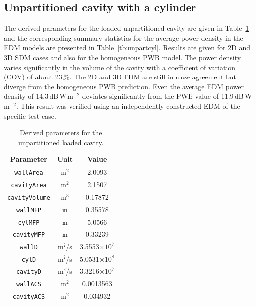 \documentclass[a4paper]{article}
\numberwithin{equation}{section}
\newcounter{Table}
\begin{document}
\subsection[Unpartitioned cavity with a cylinder]{Unpartitioned cavity with a cylinder}
\label{sc:res:unpartcyl}

The derived parameters for the loaded unpartitioned cavity are given in Table~\ref{tb:derivparamsl} and the 
corresponding summary statistics for the average power density in the EDM models are presented 
in Table~\ref{tb:unpartcyl}. Results are given for 2D and 3D SDM cases and also for the 
homogeneous PWB model. The power density varies significantly in the volume of the cavity with a coefficient 
of variation (COV) of about 23,\%. The 2D and 3D EDM are still in close agreement but diverge from the homogeneous
PWB prediction. Even the average EDM power density of 14.3\,dB\,W\,m$^{-2}$ deviates significantly from the PWB value
of 11.9\,dB\,W\,m$^{-2}$. This result was verified using an independently constructed EDM of the specific test-case. 

\begin{table}[ht]
\begin{center}
\begin{tabular}{|c|c|c|}
\hline
\textbf{Parameter}     &\textbf{Unit} &\textbf{Value}\\ 
\hline
\texttt{wallArea}      &m$^2$         &2.0093              \\
\texttt{cavityArea}    &m$^2$         &2.1507              \\
\texttt{cavityVolume}  &m$^3$         &0.17872             \\
\texttt{wallMFP}       &m             &0.35578             \\
\texttt{cylMFP}        &m             &5.0566              \\
\texttt{cavityMFP}     &m             &0.33239             \\
\texttt{wallD}         &m$^2$/s       &3.5553$\times 10^7$ \\
\texttt{cylD}          &m$^2$/s       &5.0531$\times 10^8$ \\
\texttt{cavityD}       &m$^2$/s       &3.3216$\times 10^7$ \\
\texttt{wallACS}       &m$^2$         &0.0013563           \\
\texttt{cavityACS}     &m$^2$         &0.034932            \\
\hline
\end{tabular}
\end{center}
\caption{\label{tb:derivparamsl} Derived parameters for the unpartitioned loaded cavity.}
\end{table}
\end{document}
